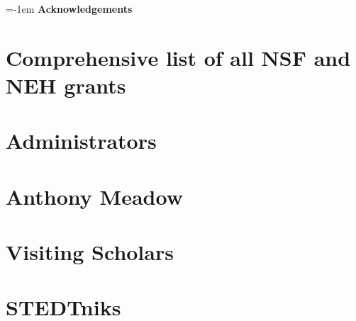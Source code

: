 {\large \parindent=-1em \textbf{Acknowledgements}}
\vspace{0.25em}

\section{Comprehensive list of all NSF and NEH grants}
\section{Administrators}
\section{Anthony Meadow}
\section{Visiting Scholars}
\section{STEDTniks}